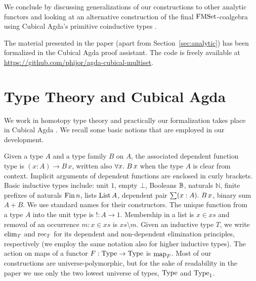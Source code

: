 \documentclass[a4paper,USenglish,cleveref]{lipics-v2021}
\begin{document}
We conclude by discussing generalizations of our constructions to other analytic functors and looking at an alternative construction of the final $\FMSet$-coalgebra using Cubical Agda's primitive coinductive types \cite{Vezzosi2019}.

The material presented in the paper (apart from Section~\ref{sec:analytic}) has been formalized in the Cubical Agda proof
assistant. The code is freely available at \url{https://github.com/phijor/agda-cubical-multiset}.

\section{Type Theory and Cubical Agda}

We work in homotopy type theory \cite{HoTTBook} and practically our formalization takes place in Cubical Agda \cite{Vezzosi2019}. We recall some basic notions that are employed in our development.

Given a type $A$ and a type family $B$ on $A$, the associated dependent function type is $(x : A) \to B \, x$, written also $\forall x \mathpunct{.}\, B\,x$ when the type $A$ is clear from context. Implicit arguments of dependent functions are enclosed in curly brackets. Basic inductive types include: unit $1$, empty $\bot$, Booleans $\mathbb{B}$, naturals $ℕ$, finite prefixes of naturals $\Fin n$, lists $\List A$, dependent pair $\sum (x : A) \mathpunct{.}\, B \, x$, binary sum $A + B$. We use standard names for their constructors. The unique function from a type $A$ into the unit type is $! : A \to 1$. Membership in a list is $x \in xs$ and removal of an occurrence $m : x \in xs$ is $xs \setminus m$. Given an inductive type $T$, we write $\Elim{T}$ and $\Rec{T}$ for its dependent and non-dependent elimination  principles, respectively (we employ the same notation also for higher inductive types). The action on maps of a functor $F : \Type \to \Type$ is $\Map{F}$. Most of our constructions are universe-polymorphic, but for the sake of readability in the paper we use only the two lowest universe of types, $\Type$ and $\Type_1$.
\end{document}
